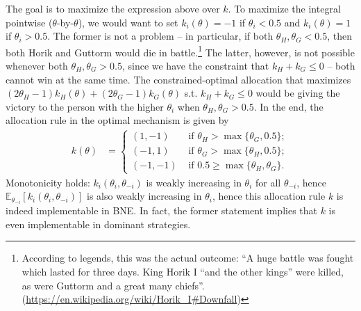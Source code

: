 \documentclass[a4paper]{article}
\begin{document}
	The goal is to maximize the expression above over $k$. To maximize the integral pointwise ($\theta$-by-$\theta$), we would want to set $k_i(\theta) = -1$ if $\theta_i < 0.5$ and $k_i(\theta) = 1$ if $\theta_i > 0.5$. The former is not a problem -- in particular, if both $\theta_H,\theta_G < 0.5$, then both Horik and Guttorm would die in battle.\footnote{According to legends, this was the actual outcome: ``A huge battle was fought which lasted for three days. King Horik I ``and the other kings'' were killed, as were Guttorm and a great many chiefs''. (\url{https://en.wikipedia.org/wiki/Horik_I\#Downfall})}
	The latter, however, is not possible whenever both $\theta_H,\theta_G>0.5$, since we have the constraint that $k_H+k_G \leq 0$ -- both cannot win at the same time. The constrained-optimal allocation that maximizes $(2\theta_H - 1) k_H(\theta) + (2\theta_G - 1) k_G(\theta)$ s.t. $k_H+k_G \leq 0$ would be giving the victory to the person with the higher $\theta_i$ when $\theta_H,\theta_G>0.5$. In the end, the allocation rule in the optimal mechanism is given by
	\begin{align*}
		k(\theta) & =\begin{cases}
			(1,-1) & \text{ if }\theta_{H}>\max\{\theta_{G},0.5\};\\
			(-1,1) & \text{ if }\theta_{G}>\max\{\theta_{H},0.5\};\\
			(-1,-1) & \text{ if }0.5\geq \max\{\theta_H,\theta_G\}.
		\end{cases}
	\end{align*}
	Monotonicity holds: $k_i(\theta_i,\theta_{-i})$ is weakly increasing in $\theta_i$ for all $\theta_{-i}$, hence $\mathbb{E}_{\theta_{-i}} [k_i(\theta_i,\theta_{-i})]$ is also weakly increasing in $\theta_i$, hence this allocation rule $k$ is indeed implementable in BNE. In fact, the former statement implies that $k$ is even implementable in dominant strategies.
	
\end{document}
